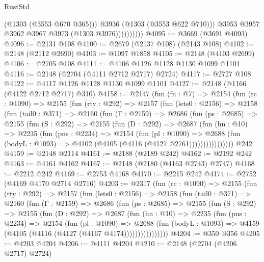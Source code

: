 \begin{lexlean}{RustStd}
\begin{coremodule}
                          (@1303 (@3553 @670 @365)))
                        @3936
                        (@1303 (@3553 @622 @710)))
                      @3953
                      @3957
                      @3962
                      @3967
                      @3973
                      (@1303 @3976))))))))))
@4095 := @3669 (@3691 @4093)
@4096 := @2131 @108
@4100 := @2679 (@2137 @108) (@2143 @108)
@4102 := @2148 (@2112 @2690)
@4103 := @1097 @1858
@4105 := @2148 (@4103 @2699)
@4106 := @2705 @108
@4111 := @4106 @1126 @1128 @1130 @1099 @1101
@4116 := @2148 (@2704 (@4111 @2712 @2717) @2724)
@4117 := @2727 @108
@4122 := @4117 @1126 @1128 @1130 @1099 @1101
@4127 := @2148 (@1166 (@4122 @2712 @2717) @310)
@4158 := @2147
    (fun (fn : @7) =>
    @2154
      (fun (rc : @1090) =>
      @2155
        (fun (rty : @292) =>
        @2157
          (fun (lets0 : @2156) =>
          @2158
            (fun (tail0 : @371) =>
            @2160
              (fun (Γ : @2159) =>
              @2686
                (fun (ps : @2685) =>
                @2155
                  (fun (S : @292) =>
                  @2155
                    (fun (D : @292) =>
                    @2687
                      (fun (hn : @10) =>
                      @2235
                        (fun (pns : @2234) =>
                        @2154
                          (fun (pl : @1090) =>
                          @2688
                            (fun (bodyL : @1093) => @4102 (@4105 (@4116 (@4127 @2761))))))))))))))))
    @242
@4159 := @2148 @2114
@4161 := @2188 (@2189 @242)
@4162 := @2192 @242
@4163 := @4161 @4162
@4167 := @2148 (@2180 (@4163 @2743) @2747)
@4168 := @2212 @242
@4169 := @2753 @4168
@4170 := @2215 @242
@4174 := @2752 (@4169 @4170 @2714 @2716)
@4203 := @2317
    (fun (rc : @1090) =>
    @2155
      (fun (rty : @292) =>
      @2157
        (fun (lets0 : @2156) =>
        @2158
          (fun (tail0 : @371) =>
          @2160
            (fun (Γ : @2159) =>
            @2686
              (fun (ps : @2685) =>
              @2155
                (fun (S : @292) =>
                @2155
                  (fun (D : @292) =>
                  @2687
                    (fun (hn : @10) =>
                    @2235
                      (fun (pns : @2234) =>
                      @2154
                        (fun (pl : @1090) =>
                        @2688
                          (fun (bodyL : @1093) =>
                          @4159 (@4105 (@4116 (@4127 (@4167 @4174))))))))))))))))
@4204 := @350 @356
@4205 := @4203 @4204
@4206 := @4111 @4204
@4210 := @2148 (@2704 (@4206 @2717) @2724)

\end{coremodule}
\end{lexlean}
